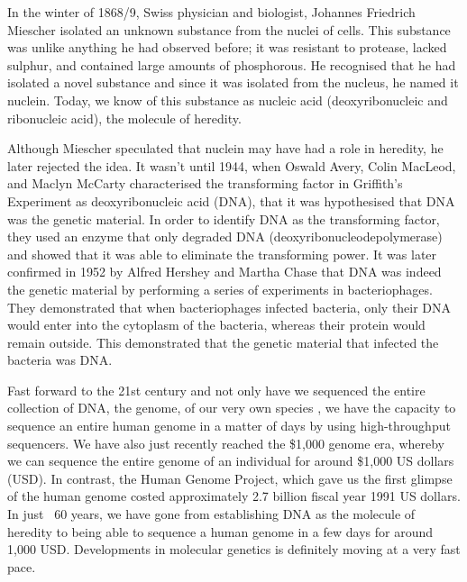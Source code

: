 \setlength{\parskip}{\baselineskip}%
\setlength{\parindent}{0pt}%

In the winter of 1868/9, Swiss physician and biologist, Johannes Friedrich Miescher isolated an unknown substance from the nuclei of cells\cite{dahm2008discovering}. This substance was unlike anything he had observed before; it was resistant to protease, lacked sulphur, and contained large amounts of phosphorous. He recognised that he had isolated a novel substance and since it was isolated from the nucleus, he named it nuclein. Today, we know of this substance as nucleic acid (deoxyribonucleic and ribonucleic acid), the molecule of heredity.

Although Miescher speculated that nuclein may have had a role in heredity, he later rejected the idea. It wasn't until 1944, when Oswald Avery, Colin MacLeod, and Maclyn McCarty characterised the transforming factor in Griffith's Experiment\cite{griffith1928significance} as deoxyribonucleic acid (DNA), that it was hypothesised that DNA was the genetic material\cite{avery1944studies}. In order to identify DNA as the transforming factor, they used an enzyme that only degraded DNA (deoxyribonucleodepolymerase) and showed that it was able to eliminate the transforming power. It was later confirmed in 1952 by Alfred Hershey and Martha Chase that DNA was indeed the genetic material by performing a series of experiments in bacteriophages\cite{hershey1952independent}. They demonstrated that when bacteriophages infected bacteria, only their DNA would enter into the cytoplasm of the bacteria, whereas their protein would remain outside. This demonstrated that the genetic material that infected the bacteria was DNA.

Fast forward to the 21st century and not only have we sequenced the entire collection of DNA, the genome, of our very own species \cite{venter2001sequence, lander2001initial}, we have the capacity to sequence an entire human genome in a matter of days by using high-throughput sequencers. We have also just recently reached the \$1,000 genome era, whereby we can sequence the entire genome of an individual for around \$1,000 US dollars (USD). In contrast, the Human Genome Project, which gave us the first glimpse of the human genome costed approximately 2.7 billion fiscal year 1991 US dollars\cite{nhgri2010cost}. In just ~60 years, we have gone from establishing DNA as the molecule of heredity to being able to sequence a human genome in a few days for around 1,000 USD. Developments in molecular genetics is definitely moving at a very fast pace.

